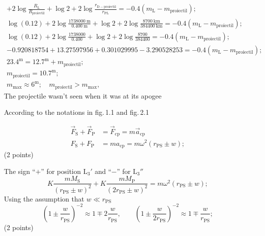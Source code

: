 \begin{description}
\begin{gather*}
      + 2\log\frac{R_{\mathrm{L}}}{R_{\mathrm{proiectil}}} + \log2
      + 2\log\frac{r_{\mathrm{D-proiectil}}}{r_{\mathrm{PL}}}
      = -0.4\left(m_{\mathrm{L}} - m_{\mathrm{proiectil}}\right); \\
    \log(0.12) + 2\log\frac{1738000\ \mathrm{m}}{0.400\ \mathrm{m}}
      + \log2 + 2\log\frac{8700\ \mathrm{km}}{384400\ \mathrm{km}}
      = -0.4\left(m_{\mathrm{L}} - m_{\mathrm{proiectil}}\right); \\
    \log(0.12) + 2\log\frac{1738000}{0.400} + \log2
      + 2\log\frac{8700}{384400}
      = -0.4\left(m_{\mathrm{L}} - m_{\mathrm{proiectil}}\right); \\
    -0.920818754 + 13.27597956 + 0.301029995 - 3.290528253
      = -0.4\left(m_{\mathrm{L}} - m_{\mathrm{proiectil}}\right); \\
    23.4^{\mathrm{m}} = 12.7^{\mathrm{m}} + m_{\mathrm{proiectil}}; \\
    m_{\mathrm{proiectil}} = 10.7^{\mathrm{m}}; \\
    m_{\max} \approx 6^{\mathrm{m}};\quad
      m_{\mathrm{proiectil}} > m_{\max},
  \end{gather*}
  The projectile wasn't seen when it was at its apogee
\end{description}

According to the notations in fig.\,1.1 and fig.\,2.1 %

\begin{align*}
  \vec{F}_{\mathrm{S}} + \vec{F}_{\mathrm{P}}
    &= \vec{F}_{\mathrm{cp}} = m\vec{a}_{\mathrm{cp}} \\
  F_{\mathrm{S}} + F_{\mathrm{P}}
    &= ma_{\mathrm{cp}} = m\omega^2\left(r_{\mathrm{PS}} \pm w\right);
\end{align*}
\hfill(2 points)

The sign ``$+$'' for position $\mathrm{L}_3'$ and ``$-$'' for $\mathrm{L}_3''$
\[
  K\frac{mM_{\mathrm{S}}}{\left(r_{\mathrm{PS}} \pm w\right)^2}
  + K\frac{mM_{\mathrm{P}}}{\left(2r_{\mathrm{PS}} \pm w\right)^2}
  = m\omega^2\left(r_{\mathrm{PS}} \pm w\right);
\]
Using the assumption that $w \ll r_{\mathrm{PS}}$
\[
  \left(1 \pm \frac{w}{r_{\mathrm{PS}}}\right)^{-2}
  \approx 1 \mp 2\frac{w}{r_{\mathrm{PS}}}, \qquad
  \left(1 \pm \frac{w}{2r_{\mathrm{PS}}}\right)^{-2}
  \approx 1 \mp \frac{w}{r_{\mathrm{PS}}};
\]
\hfill(2 points)

